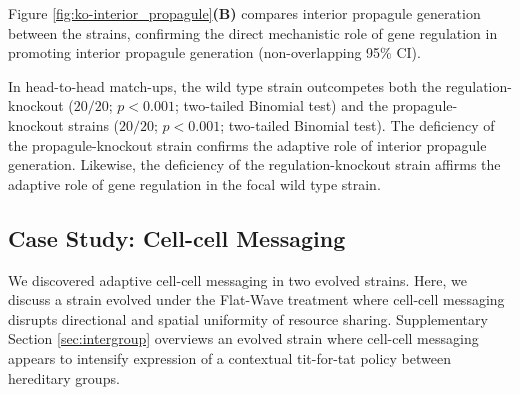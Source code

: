 Figure \ref{fig:ko-interior_propagule}\textbf{(B)} compares interior propagule generation between the strains, confirming the direct mechanistic role of gene regulation in promoting interior propagule generation (non-overlapping 95\% CI).

In head-to-head match-ups, the wild type strain outcompetes both the regulation-knockout ($20/20$; $p < 0.001$; two-tailed Binomial test) and the propagule-knockout strains
($20/20$; $p < 0.001$; two-tailed Binomial test).
The deficiency of the propagule-knockout strain confirms the adaptive role of interior propagule generation.
Likewise, the deficiency of the regulation-knockout strain affirms the adaptive role of gene regulation in the focal wild type strain.

\subsection{Case Study: Cell-cell Messaging} \label{sec:cell-cell-messaging}



We discovered adaptive cell-cell messaging in two evolved strains.
Here, we discuss a strain evolved under the Flat-Wave treatment where cell-cell messaging disrupts directional and spatial uniformity of resource sharing.
Supplementary Section \ref{sec:intergroup} overviews an evolved strain where cell-cell messaging appears to intensify expression of a contextual tit-for-tat policy between hereditary groups.

